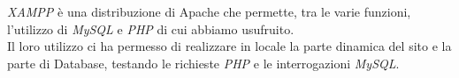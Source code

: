 \emph{XAMPP} è una distribuzione di Apache che permette, tra le varie funzioni, l'utilizzo di \emph{MySQL} e \emph{PHP} di cui abbiamo usufruito.\\
Il loro utilizzo ci ha permesso di realizzare in locale la parte dinamica del sito e la parte di Database, testando le richieste \emph{PHP} e le interrogazioni \emph{MySQL}.